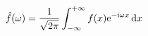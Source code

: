 

\color{text}
\[
  \hat{f}(\omega) = \frac{1}{\sqrt{2\mathrm{\pi}}} \int_{-\infty}^{+\infty} f(x)
                    \mathrm{e}^{-\mathrm{i}\omega x} \, \mathrm{d}{x}
\]

